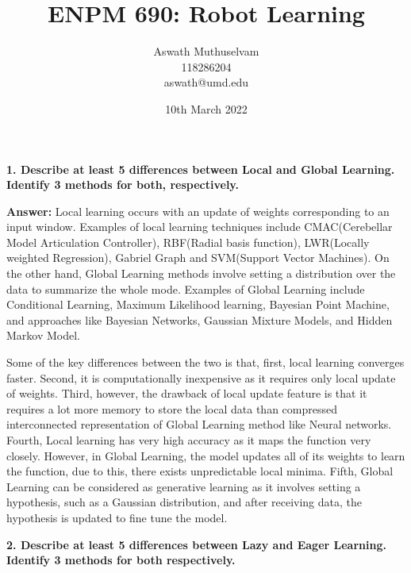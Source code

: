 \documentclass[a4paper, 10pt]{article}
\title{ENPM 690: Robot Learning}
\author{Aswath Muthuselvam \\ 118286204 \\aswath@umd.edu}
\date{10th March 2022}
\begin{document}
\maketitle
{}

\textbf{1. Describe at least 5 differences between Local and Global Learning. Identify 3 methods for both, respectively.}

\textbf{Answer:}
Local learning occurs with an update of weights corresponding to an input window. Examples of local learning techniques include CMAC(Cerebellar Model Articulation Controller), RBF(Radial basis function), LWR(Locally weighted Regression), Gabriel Graph and SVM(Support Vector Machines). On the other hand, Global Learning methods involve setting a distribution over the data to summarize the whole mode. Examples of Global Learning include Conditional Learning, Maximum Likelihood learning, Bayesian Point Machine, and approaches like Bayesian Networks, Gaussian Mixture Models, and Hidden Markov Model.\cite{localglobal}

Some of the key differences between the two is that, first, local learning converges faster. Second, it is computationally inexpensive as it requires only local update of weights. Third, however, the drawback of local update feature is that it requires a lot more memory to store the local data than compressed interconnected representation of Global Learning method like Neural networks. Fourth, Local learning has very high accuracy as it maps the function very closely. However, in Global Learning, the model updates all of its weights to learn the function, due to this, there exists unpredictable local minima. Fifth, Global Learning can be considered as generative learning as it involves setting a hypothesis, such as a Gaussian distribution, and after receiving data, the hypothesis is updated to fine tune the model. 

\hfill

\textbf{2. Describe at least 5 differences between Lazy and Eager Learning. Identify 3 methods for both respectively.}
\end{document}
